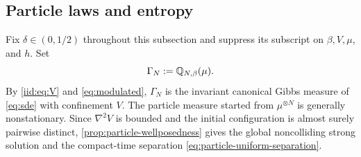 \documentclass[11pt,reqno]{amsart}
\numberwithin{equation}{section}
\theoremstyle{plain}
\theoremstyle{remark}
\begin{document}
\subsection{Particle laws and entropy}\label{iid:subsec:particle-laws}
Fix $\delta\in(0,1/2)$ throughout this subsection and suppress its subscript on $\beta,V,\mu$, and $h$. Set
\begin{equation}\label{iid:eq:Gibbs}
 \Gamma_N:=\mathbb Q_{N,\beta}(\mu).
\end{equation}
By \eqref{iid:eq:V} and \eqref{eq:modulated}, $\Gamma_N$ is the invariant canonical Gibbs measure of \eqref{eq:sde} with confinement $V$. The particle measure started from $\mu^{\otimes N}$ is generally nonstationary. Since $\nabla^2V$ is bounded and the initial configuration is almost surely pairwise distinct, \cref{prop:particle-wellposedness} gives the global noncolliding strong solution and the compact-time separation \eqref{eq:particle-uniform-separation}.
\end{document}
